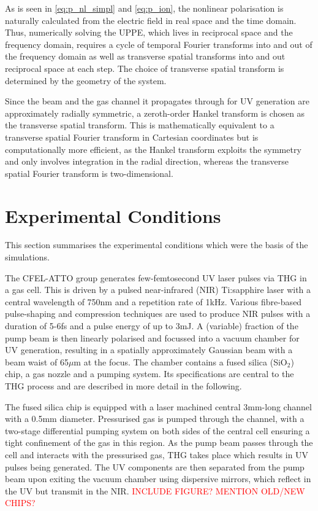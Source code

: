 \documentclass[a4paper]{jpconf}
\begin{document}
As is seen in \eqref{eq:p_nl_simpl} and \eqref{eq:p_ion}, the nonlinear polarisation is naturally calculated from the electric field in real space and the time domain. Thus, numerically solving the UPPE, which lives in reciprocal space and the frequency domain, requires a cycle of temporal Fourier transforms into and out of the frequency domain as well as transverse spatial transforms into and out reciprocal space at each step. The choice of transverse spatial transform is determined by the geometry of the system. \par 
Since the beam and the gas channel it propagates through for UV generation are approximately radially symmetric, a zeroth-order Hankel transform is chosen as the transverse spatial transform. This is mathematically equivalent to a  transverse spatial Fourier transform in Cartesian coordinates but is computationally more efficient, as the Hankel transform exploits the symmetry and only involves integration in the radial direction, whereas the transverse spatial Fourier transform is two-dimensional. 
 
\section{Experimental Conditions}
This section summarises the experimental conditions which were the basis of the simulations. \par 
The CFEL-ATTO group generates few-femtosecond UV laser pulses via THG in a gas cell. This is driven by a pulsed near-infrared (NIR) Ti:sapphire laser with a central wavelength of 750nm and a repetition rate of 1kHz. Various fibre-based pulse-shaping and compression techniques are used to produce NIR pulses with a duration of 5-6fs and a pulse energy of up to 3mJ. A (variable) fraction of the pump beam is then linearly polarised and focussed into a vacuum chamber for UV generation, resulting in a spatially approximately Gaussian beam with a beam waist of 65$\mu$m at the focus. The chamber contains a fused silica (SiO$_2$) chip, a gas nozzle and a pumping system. Its specifications are central to the THG process and are described in more detail in the following. \par 
The fused silica chip is equipped with a laser machined central 3mm-long channel with a 0.5mm diameter. Pressurised gas is pumped through the channel, with a two-stage differential pumping system on both sides of the central cell ensuring a tight confinement of the gas in this region. As the pump beam passes through the cell and interacts with the pressurised gas, THG takes place which results in UV pulses being generated. The UV components are then separated from the pump beam upon exiting the vacuum chamber using dispersive mirrors, which reflect in the UV but transmit in the NIR. 
\textcolor{red}{INCLUDE FIGURE? MENTION OLD/NEW CHIPS?}
\end{document}
